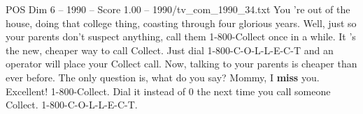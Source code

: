 \begin{textsample}{POS Dim 6 – 1990 – Score 1.00 – 1990/tv\_com\_1990\_34.txt}  \label{ex:f6_pos_074}
You 're out of the house, doing that college thing, coasting through four glorious years.
Well, just so your parents don't suspect anything, call them 1-800-Collect once in a while.
It 's the new, cheaper way to call Collect.
Just dial 1-800-C-O-L-L-E-C-T and an operator will place your Collect call.
Now, talking to your parents is cheaper than ever before.
The only question is, what do you say?
Mommy, I \textbf{miss} you.
Excellent! 1-800-Collect.
Dial it instead of 0 the next time you call someone Collect. 1-800-C-O-L-L-E-C-T.

\end{textsample}
